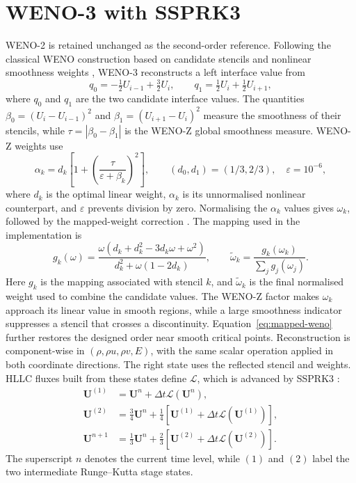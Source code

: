 \section{WENO-3 with SSPRK3}

WENO-2 is retained unchanged as the second-order reference. Following the classical WENO construction based on candidate stencils and nonlinear smoothness weights \cite{jiang1996}, WENO-3 reconstructs a left interface value from
\begin{equation}
q_0=-\tfrac12U_{i-1}+\tfrac32U_i,\qquad
q_1=\tfrac12U_i+\tfrac12U_{i+1},
\end{equation}
where \(q_0\) and \(q_1\) are the two candidate interface values.
The quantities \(\beta_0=(U_i-U_{i-1})^2\) and
\(\beta_1=(U_{i+1}-U_i)^2\) measure the smoothness of their stencils, while
\(\tau=|\beta_0-\beta_1|\) is the WENO-Z global smoothness measure. WENO-Z
weights use
\begin{equation}
\alpha_k=d_k\left[1+\left(\frac{\tau}{\varepsilon+\beta_k}\right)^2\right],
\qquad (d_0,d_1)=(1/3,2/3),\quad \varepsilon=10^{-6},
\end{equation}
where \(d_k\) is the optimal linear weight, \(\alpha_k\) is its unnormalised
nonlinear counterpart, and \(\varepsilon\) prevents division by zero.
Normalising the \(\alpha_k\) values gives \(\omega_k\), followed by the
mapped-weight correction \cite{henrick2005,borges2008}. The mapping used in
the implementation is
\begin{equation}
g_k(\omega)=
\frac{\omega\left(d_k+d_k^2-3d_k\omega+\omega^2\right)}
{d_k^2+\omega(1-2d_k)},
\qquad
\widetilde\omega_k=\frac{g_k(\omega_k)}{\sum_j g_j(\omega_j)}.
\label{eq:mapped-weno}
\end{equation}
Here \(g_k\) is the mapping associated with stencil \(k\), and
\(\widetilde\omega_k\) is the final normalised weight used to combine the
candidate values.
The WENO-Z factor makes \(\omega_k\) approach its linear value in smooth regions, while a large smoothness indicator suppresses a stencil that crosses a discontinuity. Equation~\eqref{eq:mapped-weno} further restores the designed order near smooth critical points. Reconstruction is component-wise in \((\rho,\rho u,\rho v,E)\), with the same scalar operation applied in both coordinate directions. The right state uses the reflected stencil and weights. HLLC fluxes built from these states define \(\mathcal L\), which is advanced by SSPRK3 \cite{gottlieb2001}:
\begin{align}
\mathbf U^{(1)}&=\mathbf U^n+\Delta t\mathcal L(\mathbf U^n),\\
\mathbf U^{(2)}&=\tfrac34\mathbf U^n+\tfrac14[\mathbf U^{(1)}+\Delta t\mathcal L(\mathbf U^{(1)})],\\
\mathbf U^{n+1}&=\tfrac13\mathbf U^n+\tfrac23[\mathbf U^{(2)}+\Delta t\mathcal L(\mathbf U^{(2)})].
\end{align}
The superscript \(n\) denotes the current time level, while \((1)\) and
\((2)\) label the two intermediate Runge--Kutta stage states.

